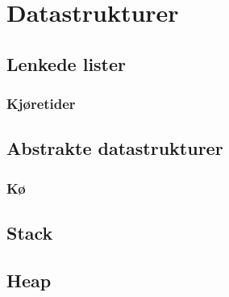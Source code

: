 \section{Datastrukturer}
\subsection{Lenkede lister}
\subsubsection{Kjøretider}
\subsection{Abstrakte datastrukturer}
\subsubsection{Kø}
\subsection{Stack}
\subsection{Heap}
